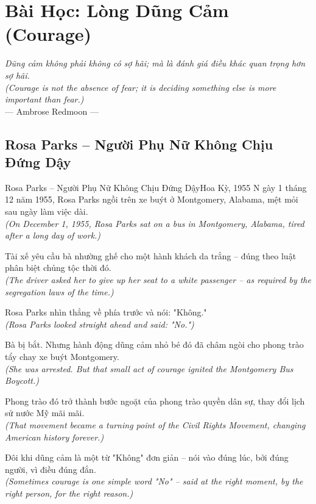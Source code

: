 \chapter{Bài Học: Lòng Dũng Cảm (Courage)}
\begin{center}
  \textit{\color{truyenblue}Dũng cảm không phải không có sợ hãi; mà là đánh giá điều khác quan trọng hơn sợ hãi.}\\
  \textit{(Courage is not the absence of fear; it is deciding something else is more important than fear.)}\\[4pt]
  \small\color{truyengold}--- Ambrose Redmoon ---
\end{center}
\ngancach

\section{Rosa Parks -- Người Phụ Nữ Không Chịu Đứng Dậy}
\begin{truyen}{Rosa Parks -- Người Phụ Nữ Không Chịu Đứng Dậy}{Hoa Kỳ, 1955}
N gày 1 tháng 12 năm 1955, Rosa Parks ngồi trên xe buýt ở Montgomery, Alabama, mệt mỏi sau ngày làm việc dài.\\
\textit{(On December 1, 1955, Rosa Parks sat on a bus in Montgomery, Alabama, tired after a long day of work.)}

Tài xế yêu cầu bà nhường ghế cho một hành khách da trắng -- đúng theo luật phân biệt chủng tộc thời đó.\\
\textit{(The driver asked her to give up her seat to a white passenger -- as required by the segregation laws of the time.)}

Rosa Parks nhìn thẳng về phía trước và nói: "Không."\\
\textit{(Rosa Parks looked straight ahead and said: "No.")}

Bà bị bắt. Nhưng hành động dũng cảm nhỏ bé đó đã châm ngòi cho phong trào tẩy chay xe buýt Montgomery.\\
\textit{(She was arrested. But that small act of courage ignited the Montgomery Bus Boycott.)}

Phong trào đó trở thành bước ngoặt của phong trào quyền dân sự, thay đổi lịch sử nước Mỹ mãi mãi.\\
\textit{(That movement became a turning point of the Civil Rights Movement, changing American history forever.)}

\end{truyen}
\begin{baihoc}
  Đôi khi dũng cảm là một từ "Không" đơn giản -- nói vào đúng lúc, bởi đúng người, vì điều đúng đắn.\\
  \textit{(Sometimes courage is one simple word "No" -- said at the right moment, by the right person, for the right reason.)}
\end{baihoc}

